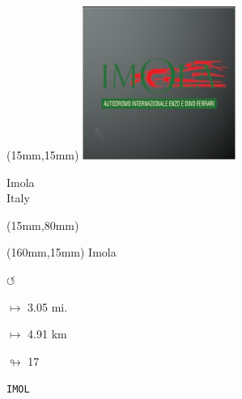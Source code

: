 \begin{textblock*}{50mm}(15mm,15mm)%
\includegraphics[width=50mm]{LG/2015-05-20_00083.png}
\par Imola\\ Italy
\end{textblock*}
\begin{textblock*}{185mm}(15mm,80mm)%
\end{textblock*}
\begin{textblock*}{40mm}(160mm,15mm)%
Imola
\par \Huge$\circlearrowleft$
\Large
\par$\mapsto$ 3.05 mi.
\par$\mapsto$ 4.91 km
\par$\looparrowright$ 17
\par\hfill\tiny\tt IMOL\\
\end{textblock*}
\null\newpage

